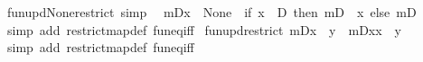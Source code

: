 \begin{isabellebody}
\endisatagproof
{\isafoldproof}%
%
\isadelimproof
\isanewline
%
\endisadelimproof
\isanewline
{}\isamarkupfalse%
\ fun{\isacharunderscore}{\kern0pt}upd{\isacharunderscore}{\kern0pt}None{\isacharunderscore}{\kern0pt}restrict\ {\isacharbrackleft}{\kern0pt}simp{\isacharbrackright}{\kern0pt}{\isacharcolon}{\kern0pt}\isanewline
\ \ {\isachardoublequoteopen}{\isacharparenleft}{\kern0pt}m{\isacharbar}{\kern0pt}{\isacharbackquote}{\kern0pt}D{\isacharparenright}{\kern0pt}{\isacharparenleft}{\kern0pt}x\ {\isacharcolon}{\kern0pt}{\isacharequal}{\kern0pt}\ None{\isacharparenright}{\kern0pt}\ {\isacharequal}{\kern0pt}\ {\isacharparenleft}{\kern0pt}if\ x\ {\isasymin}\ D\ then\ m{\isacharbar}{\kern0pt}{\isacharbackquote}{\kern0pt}{\isacharparenleft}{\kern0pt}D\ {\isacharminus}{\kern0pt}\ {\isacharbraceleft}{\kern0pt}x{\isacharbraceright}{\kern0pt}{\isacharparenright}{\kern0pt}\ else\ m{\isacharbar}{\kern0pt}{\isacharbackquote}{\kern0pt}D{\isacharparenright}{\kern0pt}{\isachardoublequoteclose}\isanewline
%
\isadelimproof
\ \ %
\endisadelimproof
%
\isatagproof
{}\isamarkupfalse%
\ {\isacharparenleft}{\kern0pt}simp\ add{\isacharcolon}{\kern0pt}\ restrict{\isacharunderscore}{\kern0pt}map{\isacharunderscore}{\kern0pt}def\ fun{\isacharunderscore}{\kern0pt}eq{\isacharunderscore}{\kern0pt}iff{\isacharparenright}{\kern0pt}%
\endisatagproof
{\isafoldproof}%
%
\isadelimproof
\isanewline
%
\endisadelimproof
\isanewline
{}\isamarkupfalse%
\ fun{\isacharunderscore}{\kern0pt}upd{\isacharunderscore}{\kern0pt}restrict{\isacharcolon}{\kern0pt}\ {\isachardoublequoteopen}{\isacharparenleft}{\kern0pt}m{\isacharbar}{\kern0pt}{\isacharbackquote}{\kern0pt}D{\isacharparenright}{\kern0pt}{\isacharparenleft}{\kern0pt}x\ {\isacharcolon}{\kern0pt}{\isacharequal}{\kern0pt}\ y{\isacharparenright}{\kern0pt}\ {\isacharequal}{\kern0pt}\ {\isacharparenleft}{\kern0pt}m{\isacharbar}{\kern0pt}{\isacharbackquote}{\kern0pt}{\isacharparenleft}{\kern0pt}D{\isacharminus}{\kern0pt}{\isacharbraceleft}{\kern0pt}x{\isacharbraceright}{\kern0pt}{\isacharparenright}{\kern0pt}{\isacharparenright}{\kern0pt}{\isacharparenleft}{\kern0pt}x\ {\isacharcolon}{\kern0pt}{\isacharequal}{\kern0pt}\ y{\isacharparenright}{\kern0pt}{\isachardoublequoteclose}\isanewline
%
\isadelimproof
\ \ %
\endisadelimproof
%
\isatagproof
{}\isamarkupfalse%
\ {\isacharparenleft}{\kern0pt}simp\ add{\isacharcolon}{\kern0pt}\ restrict{\isacharunderscore}{\kern0pt}map{\isacharunderscore}{\kern0pt}def\ fun{\isacharunderscore}{\kern0pt}eq{\isacharunderscore}{\kern0pt}iff{\isacharparenright}{\kern0pt}%

\end{isabellebody}
